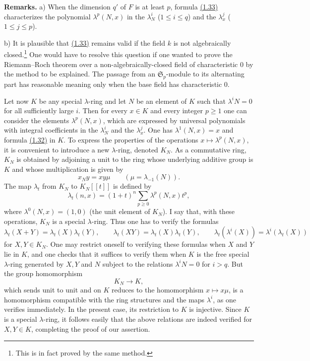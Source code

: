 \textbf{Remarks.} a) When the dimension $q'$ of $F$ is at least $p$, formula \hyperlink{sga6.e00.eq.1-33}{(1.33)} characterizes the polynomial $\lambda^p(N,x)$ in the $\lambda_N^i$ ($1\leq i\leq q$) and the $\lambda_x^j$ ($1\leq j\leq p$).

b) It is plausible that \hyperlink{sga6.e00.eq.1-33}{(1.33)} remains valid if the field $k$ is not algebraically closed.\footnote{This is in fact proved by the same method.} One would have to resolve this question if one wanted to prove the Riemann--Roch theorem over a non-algebraically-closed field of characteristic $0$ by the method to be explained. The passage from an $\mathfrak S_p$-module to its alternating part has reasonable meaning only when the base field has characteristic $0$.

Let now $K$ be any special $\lambda$-ring and let $N$ be an element of $K$ such that $\lambda^iN=0$ for all sufficiently large $i$. Then for every $x\in K$ and every integer $p\geq 1$ one can consider the elements $\lambda^p(N,x)$, which are expressed by universal polynomials with integral coefficients in the $\lambda_N^i$ and the $\lambda_x^j$. One has $\lambda^1(N,x)=x$ and formula \hyperlink{sga6.e00.eq.1-32}{(1.32)} in $K$. To express the properties of the operations $x\mapsto\lambda^p(N,x)$, it is convenient to introduce a new $\lambda$-ring, denoted $K_N$. As a commutative ring, $K_N$ is obtained by adjoining a unit to the ring whose underlying additive group is $K$ and whose multiplication is given by
\begin{equation}\tag{1.34}
x_Ny=xy\mu\qquad(\mu=\lambda_{-1}(N)).
\end{equation}
The map $\lambda_t$ from $K_N$ to $K_N[[t]]$ is defined by
\begin{equation}\tag{1.35}
\lambda_t(n,x)=(1+t)^n\sum_{p\geq 0}\lambda^p(N,x)t^p,
\end{equation}
where $\lambda^0(N,x)=(1,0)$ (the unit element of $K_N$). I say that, with these operations, $K_N$ is a special $\lambda$-ring. Thus one has to verify the formulas
\[
\lambda_t(X+Y)=\lambda_t(X)\lambda_t(Y),\qquad
\lambda_t(XY)=\lambda_t(X)\lambda_t(Y),\qquad
\lambda_t(\lambda^i(X))=\lambda^i(\lambda_t(X))
\]
for $X,Y\in K_N$. One may restrict oneself to verifying these formulas when $X$ and $Y$ lie in $K$, and one checks that it suffices to verify them when $K$ is the free special $\lambda$-ring generated by $X,Y$ and $N$ subject to the relations $\lambda^iN=0$ for $i>q$. But the group homomorphism
\begin{equation}\tag{1.36}
K_N\longrightarrow K,
\end{equation}
which sends unit to unit and on $K$ reduces to the homomorphism $x\mapsto x\mu$, is a homomorphism compatible with the ring structures and the maps $\lambda^i$, as one verifies immediately. In the present case, its restriction to $K$ is injective. Since $K$ is a special $\lambda$-ring, it follows easily that the above relations are indeed verified for $X,Y\in K$, completing the proof of our assertion.

